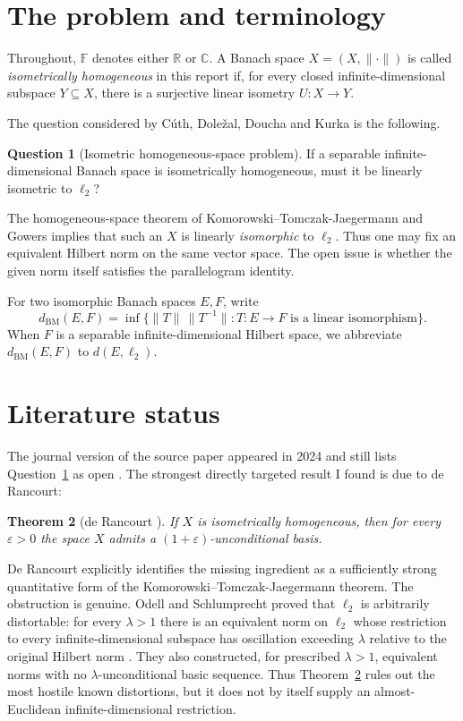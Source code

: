 \documentclass[11pt]{article}
\newtheorem{theorem}{Theorem}[section]
\theoremstyle{definition}
\newtheorem{question}[theorem]{Question}
\newcommand{\R}{\mathbb R}
\newcommand{\C}{\mathbb C}
\newcommand{\F}{\mathbb F}
\begin{document}
\tableofcontents

\section{The problem and terminology}

Throughout, $\F$ denotes either $\R$ or $\C$.  A Banach space
$X=(X,\|\cdot\|)$ is called \emph{isometrically homogeneous} in this report if,
for every closed infinite-dimensional subspace $Y\subseteq X$, there is a
surjective linear isometry $U:X\to Y$.

The question considered by C\'uth, Dole\v{z}al, Doucha and Kurka is the
following.

\begin{question}[Isometric homogeneous-space problem]\label{q:main}
If a separable infinite-dimensional Banach space is isometrically homogeneous,
must it be linearly isometric to $\ell_2$?
\end{question}

The homogeneous-space theorem of Komorowski--Tomczak-Jaegermann and Gowers
implies that such an $X$ is linearly \emph{isomorphic} to $\ell_2$.  Thus one
may fix an equivalent Hilbert norm on the same vector space.  The open issue is
whether the given norm itself satisfies the parallelogram identity.

For two isomorphic Banach spaces $E,F$, write
\[
 d_{\mathrm{BM}}(E,F)
 =\inf\{\|T\|\,\|T^{-1}\|:T:E\to F\text{ is a linear isomorphism}\}.
\]
When $F$ is a separable infinite-dimensional Hilbert space, we abbreviate
$d_{\mathrm{BM}}(E,F)$ to $d(E,\ell_2)$.

\section{Literature status}\label{sec:literature}

The journal version of the source paper appeared in 2024 and still lists
Question~\ref{q:main} as open \cite{CDDK}.  The strongest directly targeted
result I found is due to de Rancourt:

\begin{theorem}[de Rancourt \cite{deRancourt}]\label{thm:derancourt}
If $X$ is isometrically homogeneous, then for every $\varepsilon>0$ the space
$X$ admits a $(1+\varepsilon)$-unconditional basis.
\end{theorem}

De Rancourt explicitly identifies the missing ingredient as a sufficiently
strong quantitative form of the Komorowski--Tomczak-Jaegermann theorem.  The
obstruction is genuine.  Odell and Schlumprecht proved that $\ell_2$ is
arbitrarily distortable: for every $\lambda>1$ there is an equivalent norm on
$\ell_2$ whose restriction to every infinite-dimensional subspace has
oscillation exceeding $\lambda$ relative to the original Hilbert norm
\cite{OdellSchlumprecht}.  They also constructed, for prescribed $\lambda>1$,
equivalent norms with no $\lambda$-unconditional basic sequence.  Thus
Theorem~\ref{thm:derancourt} rules out the most hostile known distortions, but
it does not by itself supply an almost-Euclidean infinite-dimensional
restriction.
\end{document}
